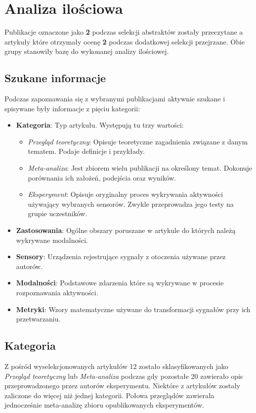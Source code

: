 \section{Analiza ilościowa}
Publikacje oznaczone jako {\bf 2} podczas selekcji abstraktów zostały przeczytane a artykuły które otrzymały ocenę {\bf 2} podczas dodatkowej selekcji przejrzane. Obie grupy stanowiły bazę do wykonanej analizy ilościowej.

\subsection{Szukane informacje}
Podczas zapoznawania się z wybranymi publikacjami aktywnie szukane i spisywane były informacje z pięciu kategorii:
\begin{itemize}
    \item {\bf Kategoria}: Typ artykułu. Występują tu trzy wartości:
    \begin{itemize}
		\item {\it Przegląd teoretyczny}: Opisuje teoretyczne zagadnienia związane z danym tematem. Podaje definicje i przykłady.
		\item {\it Meta-analiza}: Jest zbiorem wielu publikacji na określony temat. Dokonuje porównania ich założeń, podejścia oraz wyników.
		\item {\it Eksperyment}: Opisuje oryginalny proces wykrywania aktywności używający wybranych sensorów. Zwykle przeprowadza jego testy na grupie uczestników.
	\end{itemize}
    \item {\bf Zastosowania}: Ogólne obszary poruszane w artykule do których należą wykrywane modalności.
    \item {\bf Sensory}: Urządzenia rejestrujące sygnały z otoczenia używane przez autorów.
    \item {\bf Modalności}: Podstawowe zdarzenia które są wykrywane w procesie rozpoznawania aktywności.
    \item {\bf Metryki}: Wzory matematyczne używane do transformacji sygnałów przy ich przetwarzaniu.
\end{itemize}

\subsection{Kategoria}
Z pośród wyselekcjonowanych artykułów 12 zostało sklasyfikowanych jako \textit{Przegląd teoretyczny} lub \textit{Meta-analiza} podczas gdy pozostałe 20 zawierało opis przeprowadzonego przez autorów eksperymentu. Niektóre z artykułów zostały zaliczone do więcej niż jednej kategorii. Połowa przeglądów zawierała jednocześnie meta-analizę zbioru opublikowanych eksperymentów.



